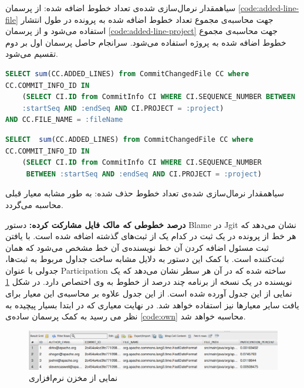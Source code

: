 ‌سیاه{‫مقدار نرمال‌سازی شده‌ی تعداد خطوط اضافه شده:‬}
از پرسمان \ref{code:added-line-file} جهت محاسبه‌ی مجموع تعداد خطوط اضافه شده به پرونده در طول انتشار استفاده می‌شود و از پرسمان \ref{code:added-line-project} جهت محاسبه‌ی مجموع خطوط اضافه شده به پروژه استفاده می‌شود. سرانجام حاصل پرسمان اول بر دوم تقسیم می‌شود. 

\begin{latin}
	\begin{lstlisting}[language=SQL]
SELECT sum(CC.ADDED_LINES) from CommitChangedFile CC where
CC.COMMIT_INFO_ID IN
	(SELECT CI.ID from CommitInfo CI WHERE CI.SEQUENCE_NUMBER BETWEEN 
	:startSeq AND :endSeq AND CI.PROJECT = :project)
AND CC.FILE_NAME = :fileName
	\end{lstlisting}
\end{latin}
\label{code:added-line-file}

\begin{latin}
\begin{lstlisting}[language=SQL]
SELECT  sum(CC.ADDED_LINES) from CommitChangedFile CC where 
CC.COMMIT_INFO_ID IN
	(SELECT CI.ID from CommitInfo CI WHERE CI.SEQUENCE_NUMBER
	 BETWEEN :startSeq AND :endSeq AND CI.PROJECT = :project)
\end{lstlisting}
\end{latin}
\label{code:added-line-project}

‌سیاه{‫مقدار نرمال‌سازی شده‌ی تعداد خطوط حذف شده:‬} به طور مشابه معیار قبلی محاسبه می‌گردد.

\textbf{درصد خطوطی که مالک فایل مشارکت کرده:}
دستور Blame در Jgit نشان می‌دهد که هر خط از پرونده در یک ثبت  در کدام یک از ثبت‌های گذشته اضافه شده است.  با یافتن ثبت مسئول اضافه کردن آن خط نویسنده‌ی آن خط مشخص می‌شود که همان ثبت‌کننده است. با کمک این دستور به دلایل مشابه ساخت جداول مربوط به ثبت‌ها، جدولی با عنوان Participation ساخته شده که در آن هر سطر نشان می‌دهد که یک نویسنده در یک نسخه از برنامه چند درصد از خطوط به وی اختصاص دارد. در شکل \ref{fig:participation} نمایی از این جدول آورده شده است.  از این جدول علاوه بر محاسبه‌ی این معیار برای یافت سایر معیارها نیز استفاده خواهد شد. در نهایت معیاری که در ابتدا بسیار پیچیده به نظر می رسید به کمک پرسمان ساده‌ی \ref{code:own} محاسبه خواهد شد. 

\begin{figure}[H]
	\centering
	\includegraphics[width=1\textwidth]{img/case_study/participation.png}
	\caption{نمایی از مخزن نرم‌افزاری}
	\label{fig:participation}
\end{figure}


